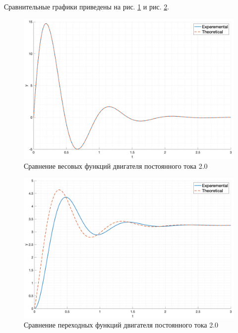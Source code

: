 Сравнительные графики приведены на рис. \ref{fig:task2_impulse_response_cmp} и рис. \ref{fig:task2_step_response_cmp}.
\begin{figure}[ht!]
    \centering
    \includegraphics[width=\textwidth]{media/plots/task2_impulse_response_cmp.png}
    \caption{Сравнение весовых функций двигателя постоянного тока 2.0}
    \label{fig:task2_impulse_response_cmp}
\end{figure}
\begin{figure}[ht!]
    \centering
    \includegraphics[width=\textwidth]{media/plots/task2_step_response_cmp.png}
    \caption{Сравнение переходных функций двигателя постоянного тока 2.0}
    \label{fig:task2_step_response_cmp}
\end{figure}

\FloatBarrier
